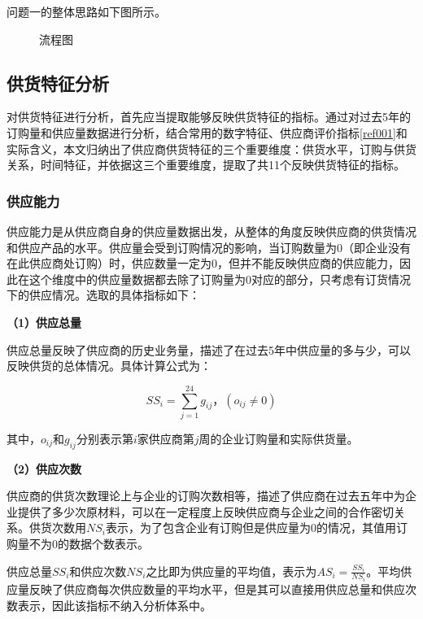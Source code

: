 \documentclass[withoutpreface,bwprint]{cumcmthesis} %
\begin{document}
问题一的整体思路如下图所示。
\begin{figure}[H]
    \label{pic001}
    \caption{流程图}
\end{figure}

\subsection{供货特征分析}
\label{5.2}

对供货特征进行分析，首先应当提取能够反映供货特征的指标。通过对过去5年的订购量和供应量数据进行分析，结合常用的数字特征、供应商评价指标\ref{ref001}和实际含义，本文归纳出了供应商供货特征的三个重要维度：供货水平，订购与供货关系，时间特征，并依据这三个重要维度，提取了共11个反映供货特征的指标。

\subsubsection{供应能力}%
供应能力是从供应商自身的供应量数据出发，从整体的角度反映供应商的供货情况和供应产品的水平。供应量会受到订购情况的影响，当订购数量为0（即企业没有在此供应商处订购）时，供应数量一定为0，但并不能反映供应商的供应能力，因此在这个维度中的供应量数据都去除了订购量为0对应的部分，只考虑有订货情况下的供应情况。选取的具体指标如下：

\begin{spacing}{1.8}\textbf{（1）供应总量}\end{spacing}
供应总量反映了供应商的历史业务量，描述了在过去5年中供应量的多与少，可以反映供货的总体情况。具体计算公式为：

\begin{equation}
    SS_i=\sum_{j=1}^{24}g_{i j}\text{，}(o_{i j}\neq 0)
\end{equation}

其中，$o_{i j}$和$g_{i j}$分别表示第$i$家供应商第$j$周的企业订购量和实际供货量。

\begin{spacing}{1.8}\textbf{（2）供应次数}\end{spacing}
供应商的供货次数理论上与企业的订购次数相等，描述了供应商在过去五年中为企业提供了多少次原材料，可以在一定程度上反映供应商与企业之间的合作密切关系。供货次数用$NS_i$表示，为了包含企业有订购但是供应量为0的情况，其值用订购量不为0的数据个数表示。

供应总量$SS_i$和供应次数$NS_i$之比即为供应量的平均值，表示为$AS_i=\frac{SS_i}{NS_i}$。平均供应量反映了供应商每次供应数量的平均水平，但是其可以直接用供应总量和供应次数表示，因此该指标不纳入分析体系中。
\end{document}
